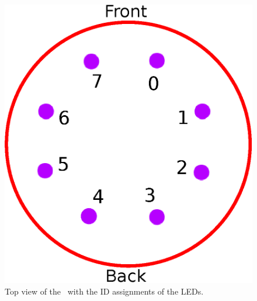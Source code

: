 \begin{figure}[htb]
\begin{center}
\includegraphics[scale=0.35]{Bilder/LightIDs.eps}
\caption{Top view of the \light\ with the ID assignments of the LEDs.}
\label{fig:lightids}
\end{center}
\end{figure}

